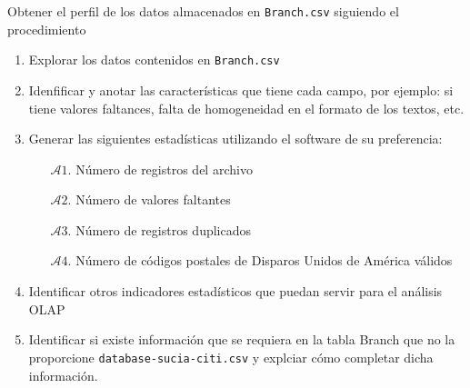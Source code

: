 Obtener el perfil de los datos almacenados en \texttt{Branch.csv} 
siguiendo el procedimiento

\begin{enumerate}
    \item Explorar los datos contenidos en \texttt{Branch.csv}
    
    \item Idenfificar y anotar las características que tiene 
        cada campo, por ejemplo: si tiene valores faltances, 
        falta de homogeneidad en el formato de los textos, etc.
    
    \item Generar las siguientes estadísticas utilizando el 
        software de su preferencia:
        \begin{itemize}
            \item[$\mathcal{A}1$.] Número de registros del archivo
            \item[$\mathcal{A}2$.] Número de valores faltantes
            \item[$\mathcal{A}3$.] Número de registros duplicados
            \item[$\mathcal{A}4$.] Número de códigos postales de 
                Disparos Unidos de América válidos     
        \end{itemize}
    
    \item Identificar otros indicadores estadísticos que puedan 
        servir para el análisis OLAP
    
    \item Identificar si existe información que se requiera en la 
        tabla Branch que no la proporcione \texttt{database-sucia-citi.csv}
        y explciar cómo completar dicha información. 
\end{enumerate}